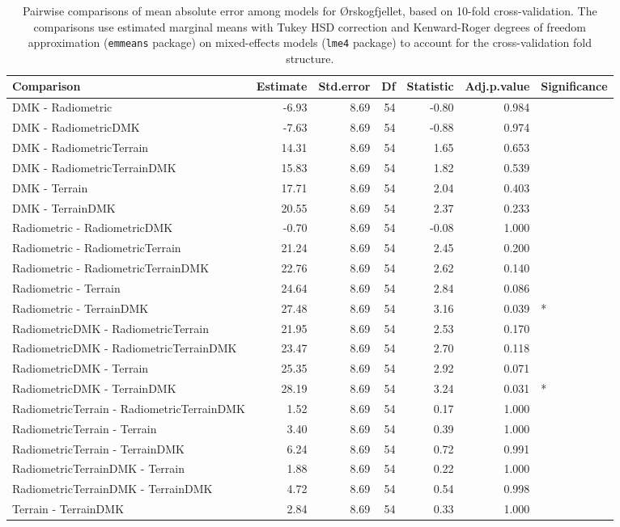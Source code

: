 \documentclass[soil, manuscript]{copernicus}
\begin{document}
\begin{table}[h]

\caption{\label{tab:pairwiseOrskogMAE}Pairwise comparisons of mean absolute error among models for Ørskogfjellet, based on 10-fold cross-validation. The comparisons use estimated marginal means with Tukey HSD correction and Kenward-Roger degrees of freedom approximation (\texttt{emmeans} package) on mixed-effects models (\texttt{lme4} package) to account for the cross-validation fold structure.}
\centering
\begin{tabular}[t]{lrrrrrl}
\hline
Comparison & Estimate & Std.error & Df & Statistic & Adj.p.value & Significance\\
\hline
DMK - Radiometric & -6.93 & 8.69 & 54 & -0.80 & 0.984 & \\
DMK - RadiometricDMK & -7.63 & 8.69 & 54 & -0.88 & 0.974 & \\
DMK - RadiometricTerrain & 14.31 & 8.69 & 54 & 1.65 & 0.653 & \\
DMK - RadiometricTerrainDMK & 15.83 & 8.69 & 54 & 1.82 & 0.539 & \\
DMK - Terrain & 17.71 & 8.69 & 54 & 2.04 & 0.403 & \\
DMK - TerrainDMK & 20.55 & 8.69 & 54 & 2.37 & 0.233 & \\
Radiometric - RadiometricDMK & -0.70 & 8.69 & 54 & -0.08 & 1.000 & \\
Radiometric - RadiometricTerrain & 21.24 & 8.69 & 54 & 2.45 & 0.200 & \\
Radiometric - RadiometricTerrainDMK & 22.76 & 8.69 & 54 & 2.62 & 0.140 & \\
Radiometric - Terrain & 24.64 & 8.69 & 54 & 2.84 & 0.086 & \\
Radiometric - TerrainDMK & 27.48 & 8.69 & 54 & 3.16 & 0.039 & *\\
RadiometricDMK - RadiometricTerrain & 21.95 & 8.69 & 54 & 2.53 & 0.170 & \\
RadiometricDMK - RadiometricTerrainDMK & 23.47 & 8.69 & 54 & 2.70 & 0.118 & \\
RadiometricDMK - Terrain & 25.35 & 8.69 & 54 & 2.92 & 0.071 & \\
RadiometricDMK - TerrainDMK & 28.19 & 8.69 & 54 & 3.24 & 0.031 & *\\
RadiometricTerrain - RadiometricTerrainDMK & 1.52 & 8.69 & 54 & 0.17 & 1.000 & \\
RadiometricTerrain - Terrain & 3.40 & 8.69 & 54 & 0.39 & 1.000 & \\
RadiometricTerrain - TerrainDMK & 6.24 & 8.69 & 54 & 0.72 & 0.991 & \\
RadiometricTerrainDMK - Terrain & 1.88 & 8.69 & 54 & 0.22 & 1.000 & \\
RadiometricTerrainDMK - TerrainDMK & 4.72 & 8.69 & 54 & 0.54 & 0.998 & \\
Terrain - TerrainDMK & 2.84 & 8.69 & 54 & 0.33 & 1.000 & \\
\hline
\end{tabular}
\end{table}
\clearpage
\end{document}

